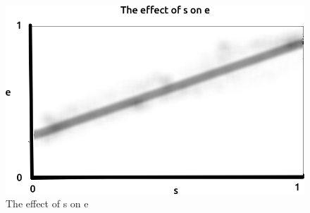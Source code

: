 \begin{figure}[!htbp]
  \includegraphics[width=\textwidth]{razzo-figures/fig_1.png}
  \caption{
    The effect of s on e
  }
  \label{fig:1}
\end{figure}